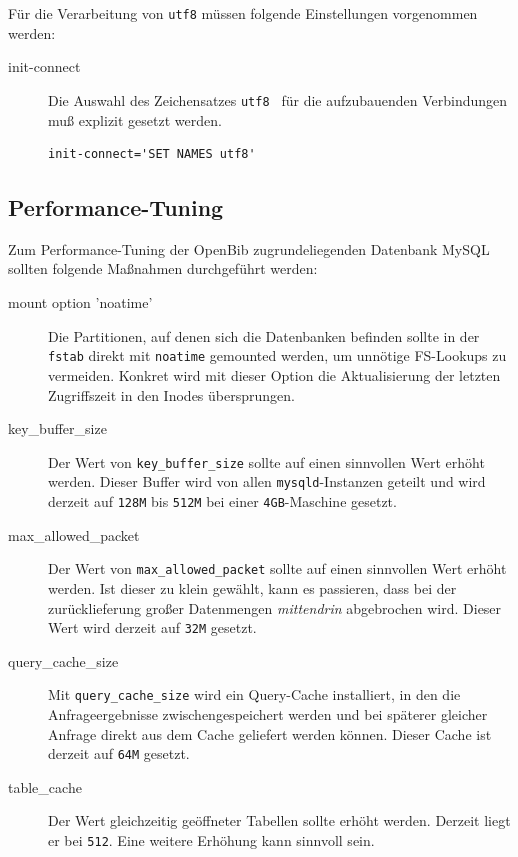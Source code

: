 \documentclass[11pt, twoside, a4paper, BCOR8mm, DIV12, bibtotoc,idxtotoc]{scrbook}
\begin{document}
Für die Verarbeitung von \texttt{utf8} müssen folgende Einstellungen vorgenommen werden:

\begin{description}
\item[init-connect] Die Auswahl des Zeichensatzes \texttt{utf8 } für die aufzubauenden Verbindungen muß explizit gesetzt werden.
\begin{verbatim}
init-connect='SET NAMES utf8'
\end{verbatim}

\end{description}

\subsection{Performance-Tuning}

Zum Performance-Tuning der OpenBib zugrundeliegenden Datenbank MySQL
sollten folgende Maßnahmen durchgeführt werden:

\begin{description}
\item[mount option 'noatime'] Die Partitionen, auf denen sich die
  Datenbanken befinden sollte in der \texttt{fstab} direkt mit
  \texttt{noatime} gemounted werden, um unnötige FS-Lookups zu
  vermeiden. Konkret wird mit dieser Option die Aktualisierung der
  letzten Zugriffszeit in den Inodes übersprungen.
\item[key\_buffer\_size] Der Wert von
  \texttt{key\_buffer\_size} sollte auf einen sinnvollen Wert erhöht
  werden. Dieser Buffer wird von allen \texttt{mysqld}-Instanzen
  geteilt und wird derzeit auf \texttt{128M} bis \texttt{512M} bei
  einer \texttt{4GB}-Maschine gesetzt.
\item[max\_allowed\_packet] Der Wert von
  \texttt{max\_allowed\_packet} sollte auf einen sinnvollen Wert
  erhöht werden. Ist dieser zu klein gewählt, kann es passieren,
  dass bei der zurücklieferung großer Datenmengen
  \textit{mittendrin} abgebrochen wird. Dieser Wert wird derzeit auf
  \texttt{32M} gesetzt.
\item[query\_cache\_size] Mit \texttt{query\_cache\_size}
  wird ein Query-Cache installiert, in den die Anfrageergebnisse
  zwischengespeichert werden und bei späterer gleicher Anfrage direkt
  aus dem Cache geliefert werden können. Dieser Cache ist derzeit auf
  \texttt{64M} gesetzt.
  \item[table\_cache] Der Wert gleichzeitig geöffneter Tabellen
    sollte erhöht werden. Derzeit liegt er bei \texttt{512}. Eine
    weitere Erhöhung kann sinnvoll sein.
\end{description}
\end{document}
